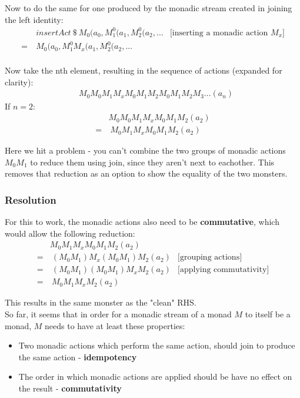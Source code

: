 \documentclass{article}
\begin{document}
Now to do the same for one produced by the monadic stream created in joining the left identity:
\begin{align*}
& insertAct\ \$\ M_0(a_0, M^0_1(a_1, M^0_2 (a_2,... & \text{[inserting a monadic action $M_x$]}\\
=\ & M_0(a_0, M^0_1M_x(a_1, M^0_2 (a_2,... \\
\end{align*}

Now take the nth element, resulting in the sequence of actions (expanded for clarity):
\begin{align*}
& M_0M_0M_1M_xM_0M_1M_2M_0M_1M_2M_3... (a_n)
\end{align*}
If $n = 2$:
\begin{align*}
& M_0M_0M_1M_xM_0M_1M_2 (a_2)\\
=&\ M_0M_1M_xM_0M_1M_2 (a_2)
\end{align*}

Here we hit a problem - you can't combine the two groups of monadic actions $M_0M_1$ to reduce them using join, since they aren't next to eachother. This removes that reduction as an option to show the equality of the two monsters. \\

\subsubsection{Resolution}

For this to work, the monadic actions also need to be \textbf{commutative}, which would allow the following reduction:
\begin{align*}
& M_0M_1M_xM_0M_1M_2 (a_2)\\
=&\ (M_0M_1)M_x(M_0M_1)M_2 (a_2) &\text{[grouping actions]}\\
=&\ (M_0M_1)(M_0M_1)M_xM_2 (a_2) &\text{[applying commutativity]}\\
=&\ M_0M_1M_xM_2 (a_2)
\end{align*}

This results in the same monster as the "clean" RHS.\\

So far, it seems that in order for a monadic stream of a monad $M$ to itself be a monad, $M$ needs to have at least these properties:
\begin{itemize}
	\item Two monadic actions which perform the same action, should join to produce the same action - \textbf{idempotency}
	\item The order in which monadic actions are applied should be have no effect on the result - \textbf{commutativity} 
\end{itemize}
\end{document}
